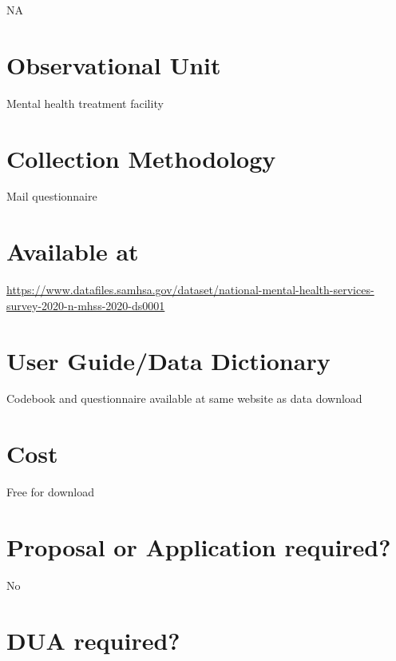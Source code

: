 \documentclass[
]{book}
\begin{document}
NA

\hypertarget{observational-unit-61}{%
\section{Observational Unit}\label{observational-unit-61}}

Mental health treatment facility

\hypertarget{collection-methodology-61}{%
\section{Collection Methodology}\label{collection-methodology-61}}

Mail questionnaire

\hypertarget{available-at-61}{%
\section{Available at}\label{available-at-61}}

\url{https://www.datafiles.samhsa.gov/dataset/national-mental-health-services-survey-2020-n-mhss-2020-ds0001}

\hypertarget{user-guidedata-dictionary-61}{%
\section{User Guide/Data Dictionary}\label{user-guidedata-dictionary-61}}

Codebook and questionnaire available at same website as data download

\hypertarget{cost-61}{%
\section{Cost}\label{cost-61}}

Free for download

\hypertarget{proposal-or-application-required-61}{%
\section{Proposal or Application required?}\label{proposal-or-application-required-61}}

No

\hypertarget{dua-required-61}{%
\section{DUA required?}\label{dua-required-61}}
\end{document}
